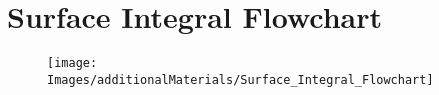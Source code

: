 \section{Surface Integral Flowchart}

\begin{figure}[h]
	\centering
	\hspace*{-1.5in}
	\texttt{[image: Images/additionalMaterials/Surface\_Integral\_Flowchart]}
\end{figure}

\pagebreak